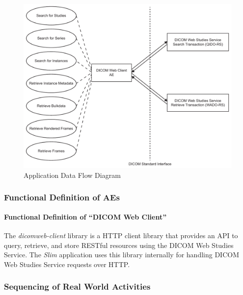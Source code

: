 \documentclass[12pt, letterpaper]{article}
\begin{document}
\begin{figure}[h!]
  \includegraphics[width=\textwidth]{./figures/application-data-flow.pdf}
  \caption{Application Data Flow Diagram}
  \label{figure:1}
\end{figure}

\subsubsection{Functional Definition of AEs}

\paragraph{Functional Definition of ``DICOM Web Client''}

The \emph{dicomweb-client} library is a \gls{HTTP} client library that provides an \gls{API} to query, retrieve, and store \gls{REST}ful resources using the DICOM Web Studies Service.
The \emph{Slim} application uses this library internally for handling DICOM Web Studies Service requests over \gls{HTTP}.

\subsubsection{Sequencing of Real World Activities}
\end{document}
